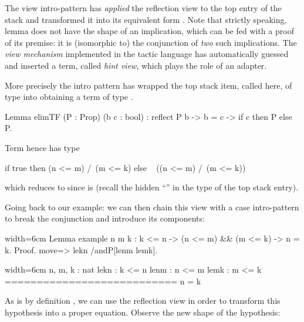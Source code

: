 The view intro-pattern  has \emph{applied} the reflection
view  to
the top entry of the stack  and transformed it into
its equivalent form . Note that strictly
speaking, lemma  does not have the shape of an implication,
which can be fed with a proof of its premise: it is (isomorphic to) the
conjunction of \emph{two} such implications. The \emph{view mechanism}
implemented in the tactic language has automatically guessed and
inserted a term, called \emph{hint view}, which plays the role of an
adapter.

More precisely the  intro pattern has wrapped the top
stack item, called  here, of type  into
 obtaining a term of type
.

\begin{coq}{}{}
Lemma elimTF (P : Prop) (b c : bool) :
  reflect P b -> b = c -> if c then P else ~ P.
\end{coq}
Term  hence has type

\begin{coq}{}{}
if true then (n <= m) /\ (m <= k) else ~ ((n <= m) /\ (m <= k))
\end{coq}
which reduces to  since  is 
(recall the hidden ``'' in the type of the top stack entry).

Going back to  our example: we can then chain this view with a case
intro-pattern to break the conjunction and introduce its components:

\begin{coq-left}{}{width=6cm}
Lemma example n m k : k <= n ->
  (n <= m) && (m <= k) -> n = k.
Proof.
move=> lekn /andP[lenm lemk].
$~$
$~$
\end{coq-left}
\begin{coqout-right}{}{width=6cm}
n, m, k : nat
lekn : k <= n
lenm : n <= m
lemk : m <= k
===========================
n = k
\end{coqout-right}

As  is by definition , we can use the
reflection view
 in order to transform this hypothesis into a proper equation.
Observe the new shape of the  hypothesis:

